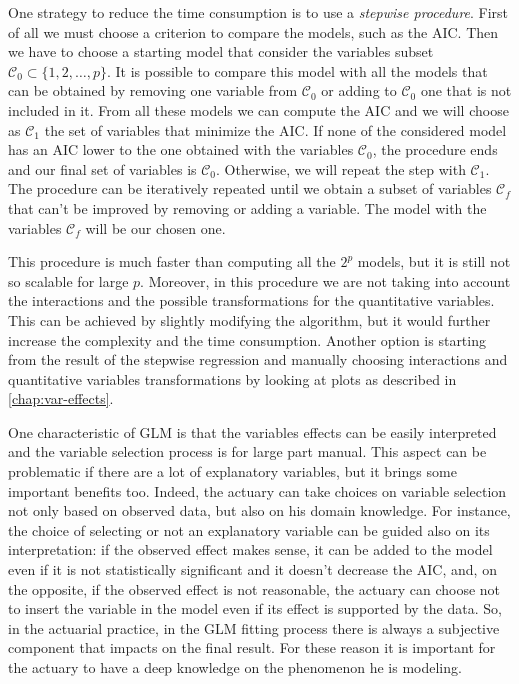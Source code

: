 \documentclass[a4paper, nobind]{templates/ociamthesis}
\theoremstyle{definition}
\theoremstyle{definition}
\theoremstyle{definition}
\theoremstyle{remark}
\begin{document}
One strategy to reduce the time consumption is to use a \emph{stepwise procedure}. First of all we must choose a criterion to compare the models, such as the AIC. Then we have to choose a starting model that consider the variables subset \(\mathcal{C}_0 \subset \{ 1,2,\dots,p \}\). It is possible to compare this model with all the models that can be obtained by removing one variable from \(\mathcal{C}_0\) or adding to \(\mathcal{C}_0\) one that is not included in it. From all these models we can compute the AIC and we will choose as \(\mathcal{C}_1\) the set of variables that minimize the AIC. If none of the considered model has an AIC lower to the one obtained with the variables \(\mathcal{C}_0\), the procedure ends and our final set of variables is \(\mathcal{C}_0\). Otherwise, we will repeat the step with \(\mathcal{C}_1\). The procedure can be iteratively repeated until we obtain a subset of variables \(\mathcal{C}_f\) that can't be improved by removing or adding a variable. The model with the variables \(\mathcal{C}_f\) will be our chosen one.

This procedure is much faster than computing all the \(2^p\) models, but it is still not so scalable for large \(p\). Moreover, in this procedure we are not taking into account the interactions and the possible transformations for the quantitative variables. This can be achieved by slightly modifying the algorithm, but it would further increase the complexity and the time consumption. Another option is starting from the result of the stepwise regression and manually choosing interactions and quantitative variables transformations by looking at plots as described in \ref{chap:var-effects}.

One characteristic of GLM is that the variables effects can be easily interpreted and the variable selection process is for large part manual. This aspect can be problematic if there are a lot of explanatory variables, but it brings some important benefits too. Indeed, the actuary can take choices on variable selection not only based on observed data, but also on his domain knowledge. For instance, the choice of selecting or not an explanatory variable can be guided also on its interpretation: if the observed effect makes sense, it can be added to the model even if it is not statistically significant and it doesn't decrease the AIC, and, on the opposite, if the observed effect is not reasonable, the actuary can choose not to insert the variable in the model even if its effect is supported by the data. So, in the actuarial practice, in the GLM fitting process there is always a subjective component that impacts on the final result. For these reason it is important for the actuary to have a deep knowledge on the phenomenon he is modeling.
\end{document}
